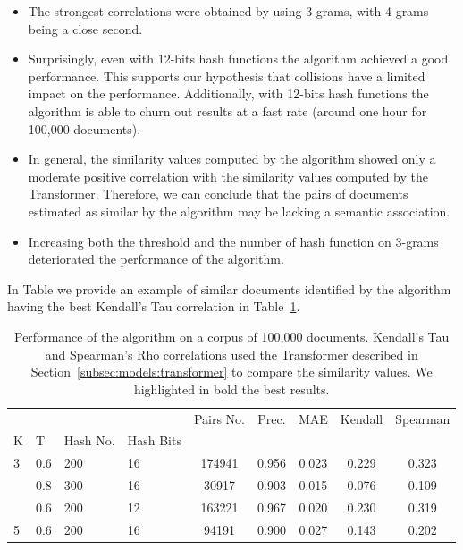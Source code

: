 \documentclass[runningheads]{llncs}
\begin{document}
\begin{itemize}
  \item The strongest correlations were obtained by using 3-grams, with 4-grams being a close second.
  \item Surprisingly, even with 12-bits hash functions the algorithm achieved a good performance. This supports our hypothesis that collisions have a limited impact on the performance. Additionally, with 12-bits hash functions the algorithm is able to churn out results at a fast rate (around one hour for 100,000 documents).   
  \item In general, the similarity values computed by the algorithm showed only a moderate positive correlation with the similarity values computed by the Transformer. Therefore, we can conclude that the pairs of documents estimated as similar by the algorithm may be lacking a semantic association.
  \item Increasing both the threshold and the number of hash function on 3-grams deteriorated the performance of the algorithm.
\end{itemize}

In Table we provide an example of similar documents identified by the algorithm having the best Kendall's Tau correlation in Table~\ref{tab:experiments:d100k}.

\begin{table}
  \caption{Performance of the algorithm on a corpus of 100,000 documents. Kendall's Tau and Spearman's Rho correlations used the Transformer described in Section~\ref{subsec:models:transformer} to compare the similarity values. We highlighted in bold the best results.}
  \label{tab:experiments:d100k}
  \centering
  \begin{tabular}{llllccccc}
  \toprule
    &     &     &    &  Pairs No. &  Prec. &    MAE &  Kendall &  Spearman \\ K & T & Hash No. & Hash Bits &            &        &        &          &           \\
  \midrule 
  3 & 0.6 & 200 & 16 &     174941 &  0.956 &  0.023 &    0.229 &     0.323 \\  & 0.8 & 300 & 16 &      30917 &  0.903 &  0.015 &    0.076 &     0.109 \\  & 0.6 & 200 & 12 &     163221 &  0.967 &  0.020 &    0.230 &     0.319 \\ 5 & 0.6 & 200 & 16 &      94191 &  0.900 &  0.027 &    0.143 &     0.202 \\
  \bottomrule
  \end{tabular}
\end{table}
\end{document}
